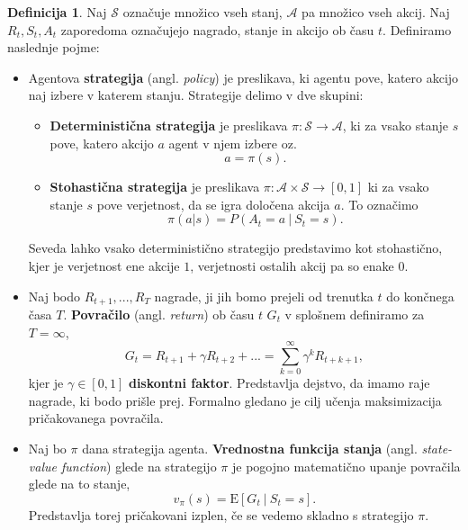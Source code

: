 \documentclass[12pt,a4paper]{amsart}
\theoremstyle{definition} %
\newtheorem{definicija}{Definicija}[section]
\theoremstyle{plain} %
\begin{document}
\begin{definicija}
    Naj $\mathcal{S}$ označuje množico vseh stanj, $\mathcal{A}$ pa množico vseh akcij. Naj $R_t,
    S_t, A_t$ zaporedoma označujejo nagrado, stanje in akcijo ob času $t$. Definiramo naslednje 
    pojme: 
    \begin{itemize}
        \item   Agentova \textbf{strategija} (angl. \textit{policy}) je preslikava, ki agentu pove, 
                katero akcijo naj izbere v katerem stanju. Strategije delimo v dve skupini:
                \begin{itemize}
                    \item \textbf{Deterministična strategija} je preslikava $\pi: \mathcal{S} 
                    \rightarrow \mathcal{A}$, ki za vsako stanje $s$ pove, katero akcijo $a$ agent v njem 
                    izbere oz.
                    $$
                    a = \pi(s).
                    $$
                    \item \textbf{Stohastična strategija} je preslikava $\pi: \mathcal{A} \times 
                    \mathcal{S} \rightarrow [0, 1]$ ki za vsako stanje $s$ pove verjetnost, da se igra 
                    določena akcija $a$. To označimo 
                    $$
                    \pi(a | s) = P(A_t = a~|~S_t = s).
                    $$
                \end{itemize}
                Seveda lahko vsako deterministično strategijo predstavimo kot stohastično, kjer je 
                verjetnost ene akcije $1$, verjetnosti ostalih akcij pa so enake $0$.
        
        \item Naj bodo $R_{t+1}, ...,R_T$ nagrade, ji jih bomo prejeli od trenutka 
                $t$ do končnega časa $T$. \textbf{Povračilo} (angl. \textit{return}) ob času $t$ $G_t$ 
                v splošnem definiramo za $T=\infty$,
                $$
                G_t = R_{t+1} + \gamma R_{t+2} + ... = \sum_{k=0}^\infty \gamma^k R_{t + k + 1} ,
                $$
                kjer je $\gamma \in [0,1]$ \textbf{diskontni faktor}. Predstavlja dejstvo, da 
                imamo raje nagrade, ki bodo prišle prej. Formalno gledano je cilj učenja 
                maksimizacija pričakovanega povračila.

         \item Naj bo $\pi$ dana strategija agenta. \textbf{Vrednostna funkcija 
                stanja} (angl. \textit{state-value function}) glede na strategijo $\pi$ je 
                pogojno matematično upanje povračila glede na to stanje, 
                $$
                v_\pi(s) = \mathrm{E} [G_t~|~S_t = s].
                $$
                Predstavlja torej pričakovani izplen, če se vedemo skladno s strategijo $\pi$.


\end{itemize}
\end{definicija}
\end{document}
